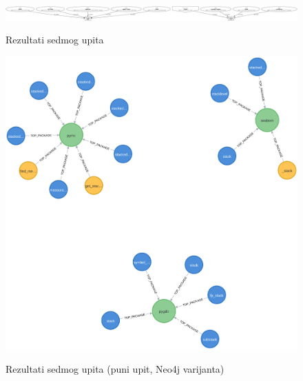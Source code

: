 \begin{figure}
    \includegraphics[scale=0.12, angle=90]{assets/stack.png}
    \label{fig:upit7}
    \centering
    \caption{Rezultati sedmog upita}
\end{figure}


\begin{figure}
    \includegraphics[scale=0.3]{assets/stack2.png}
    \label{fig:upit72}
    \centering
    \caption{Rezultati sedmog upita (puni upit, Neo4j varijanta)}
\end{figure}
